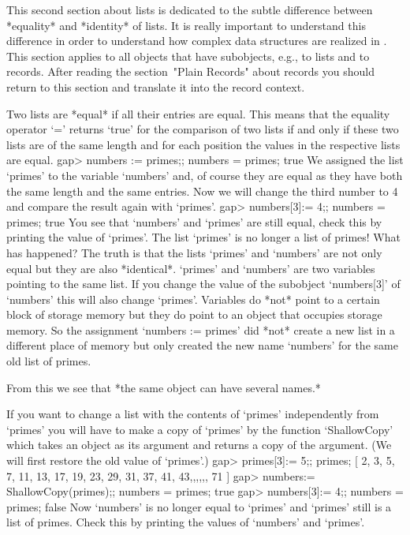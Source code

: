 
This second  section  about lists is dedicated  to  the subtle difference
between  *equality*  and *identity*  of lists. It is really important to
understand   this  difference in  order   to  understand how complex data
structures are  realized in {\GAP}.   This section applies  to all {\GAP}
objects  that have  subobjects,  e.g.,  to lists   and to  records. After
reading the section~"Plain Records" about records you should return to
this section and translate it into the record context.

Two  lists are *equal* if all their entries are equal.  This means that the
equality operator `=' returns `true' for the  comparison of  two lists if
and  only if these two lists are of the same length and for each position
the values in the respective lists are equal.
\beginexample
gap> numbers := primes;; numbers = primes;
true
\endexample
We assigned  the  list `primes' to the variable  `numbers' and, of course
they are equal as they have  both  the same length  and the same entries.
Now we  will change the  third number to  4 and  compare the result again
with `primes'.
\beginexample
gap> numbers[3]:= 4;; numbers = primes;
true
\endexample
You  see that  `numbers' and  `primes'  are still   equal, check this  by
printing the value of `primes'. The list `primes' is  no longer a list of
primes! What has  happened?  The truth is  that  the  lists  `primes' and
`numbers' are  not only equal but they are also *identical*. `primes' and
`numbers' are two variables pointing to the  same list. If you change the
value of  the subobject `numbers[3]'  of `numbers' this will  also change
`primes'.  Variables do *not* point to  a certain block of storage memory
but they do  point  to an object that  occupies  storage memory.   So the
assignment `numbers := primes' did *not* create a new list in a different
place of memory but only created the new name `numbers'  for the same old
list of primes.

From this we see that *the same object can have several names.*

If you want to change a list with the  contents of `primes' independently
from `primes'  you will have to  make a copy of  `primes' by the function
`ShallowCopy' which takes an object as its argument and returns a copy of
the argument. (We will first restore the old value of `primes'.)
\beginexample
gap> primes[3]:= 5;; primes;
[ 2, 3, 5, 7, 11, 13, 17, 19, 23, 29, 31, 37, 41, 43,,,,,, 71 ]
gap> numbers:= ShallowCopy(primes);; numbers = primes;
true
gap> numbers[3]:= 4;; numbers = primes;
false
\endexample
Now `numbers' is no longer equal to `primes' and `primes' still is a list
of primes.  Check this by printing the values of `numbers' and `primes'.

